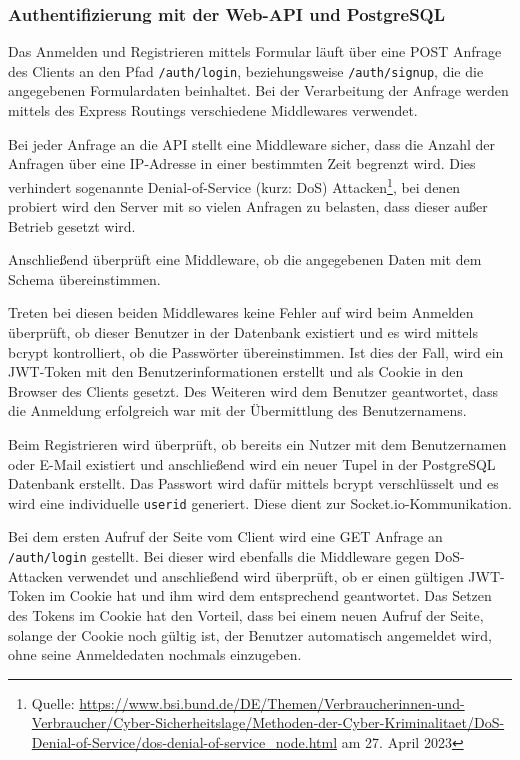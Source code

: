 \subsubsection{Authentifizierung mit der Web-API und PostgreSQL}
Das Anmelden und Registrieren mittels Formular läuft über eine POST Anfrage des Clients an den Pfad \verb|/auth/login|, beziehungsweise \verb|/auth/signup|, die die angegebenen Formulardaten beinhaltet. Bei der Verarbeitung der Anfrage werden mittels des Express Routings verschiedene Middlewares verwendet.

Bei jeder Anfrage an die API stellt eine Middleware sicher, dass die Anzahl der Anfragen über eine IP-Adresse in einer bestimmten Zeit begrenzt wird. Dies verhindert sogenannte Denial-of-Service (kurz: DoS) Attacken\footnote{Quelle: \url{https://www.bsi.bund.de/DE/Themen/Verbraucherinnen-und-Verbraucher/Cyber-Sicherheitslage/Methoden-der-Cyber-Kriminalitaet/DoS-Denial-of-Service/dos-denial-of-service_node.html} am 27. April 2023}, bei denen probiert wird den Server mit so vielen Anfragen zu belasten, dass dieser außer Betrieb gesetzt wird.

Anschließend überprüft eine Middleware, ob die angegebenen Daten mit dem Schema übereinstimmen. 

Treten bei diesen beiden Middlewares keine Fehler auf wird beim Anmelden überprüft, ob dieser Benutzer in der Datenbank existiert und es wird mittels bcrypt kontrolliert, ob die Passwörter übereinstimmen. Ist dies der Fall, wird ein JWT-Token mit den Benutzerinformationen erstellt und als Cookie in den Browser des Clients gesetzt. Des Weiteren wird dem Benutzer geantwortet, dass die Anmeldung erfolgreich war mit der Übermittlung des Benutzernamens.

Beim Registrieren wird überprüft, ob bereits ein Nutzer mit dem Benutzernamen oder E-Mail existiert und anschließend wird ein neuer Tupel in der PostgreSQL Datenbank erstellt. Das Passwort wird dafür mittels bcrypt verschlüsselt und es wird eine individuelle \verb|userid| generiert. Diese dient zur Socket.io-Kommunikation.

Bei dem ersten Aufruf der Seite vom Client wird eine GET Anfrage an \verb|/auth/login| gestellt. Bei dieser wird ebenfalls die Middleware gegen DoS-Attacken verwendet und anschließend wird überprüft, ob er einen gültigen JWT-Token im Cookie hat und ihm wird dem entsprechend geantwortet. Das Setzen des Tokens im Cookie hat den Vorteil, dass bei einem neuen Aufruf der Seite, solange der Cookie noch gültig ist, der Benutzer automatisch angemeldet wird, ohne seine Anmeldedaten nochmals einzugeben.

